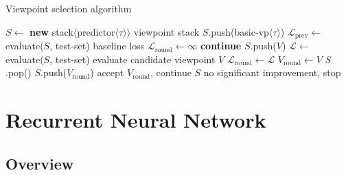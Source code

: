 \documentclass[12pt,a4paper,twoside,openright]{report}
\begin{document}
\begin{algorithm}[H]
  \caption{Viewpoint selection algorithm}
  \label{alg:vp-select}
  \begin{algorithmic}[1]
      \State $S \gets$ \textbf{new}
      stack$\langle$predictor$\langle\tau\rangle\rangle$ 
      \Comment viewpoint stack
      \State $S$.push(basic-vp$\langle\tau\rangle$)
      \State $\mathcal{L}_{\mathrm{prev}} \gets$ evaluate($S$, test-set)
      \Comment baseline loss
      \Loop
        \State $\mathcal{L}_{\mathrm{round}} \gets \infty$
           \textbf{continue}
          \EndIf
          \State $S$.push($V$)
          \State $\mathcal{L} \gets$ evaluate($S$, test-set) 
          \Comment evaluate candidate viewpoint $V$
            \State $\mathcal{L}_{\mathrm{round}} \gets \mathcal{L}$
            \State $V_{\mathrm{round}} \gets V$
          \EndIf
          \State $S$.pop()
        \EndFor
          \State $S$.push($V_{\mathrm{round}}$)
          \Comment accept $V_{\mathrm{round}}$, continue
        \Else
          \State \Return $S$
          \Comment no significant improvement, stop
        \EndIf
      \EndLoop
    \EndFunction
  \end{algorithmic}
\end{algorithm}

\section{Recurrent Neural Network}

\subsection{Overview}
\end{document}

